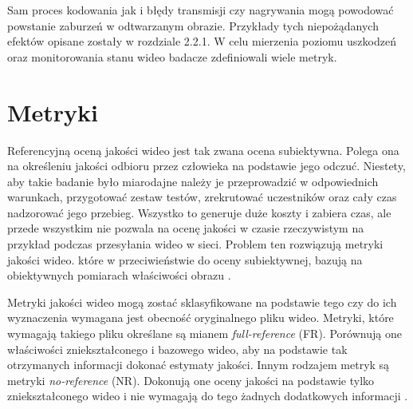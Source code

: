 Sam proces kodowania jak i błędy transmisji czy nagrywania mogą powodować powstanie zaburzeń w odtwarzanym obrazie. Przykłady tych niepożądanych efektów opisane zostały w rozdziale 2.2.1. W celu mierzenia poziomu uszkodzeń oraz monitorowania stanu wideo badacze zdefiniowali wiele metryk.\par 


\section{Metryki}

Referencyjną oceną jakości wideo jest tak zwana ocena subiektywna. Polega ona na określeniu jakości odbioru przez człowieka na podstawie jego odczuć. Niestety, aby takie badanie było miarodajne należy je przeprowadzić w odpowiednich warunkach, przygotować zestaw testów, zrekrutować uczestników oraz cały czas nadzorować jego przebieg. Wszystko to generuje duże koszty i zabiera czas, ale przede wszystkim nie pozwala na ocenę jakości w czasie rzeczywistym na przykład podczas przesyłania wideo w sieci. Problem ten rozwiązują metryki jakości wideo. które w przeciwieństwie do oceny subiektywnej, bazują na obiektywnych pomiarach właściwości obrazu \cite{vqm}.\par

Metryki jakości wideo mogą zostać sklasyfikowane na podstawie tego czy do ich wyznaczenia wymagana jest obecność oryginalnego pliku wideo. Metryki, które wymagają takiego pliku określane są mianem {\em  full-reference} (FR). Porównują one właściwości zniekształconego i bazowego wideo, aby na podstawie tak otrzymanych informacji dokonać estymaty jakości. Innym rodzajem metryk są metryki {\em no-reference} (NR). Dokonują one oceny jakości na podstawie tylko zniekształconego wideo i nie wymagają do tego żadnych dodatkowych informacji \cite{vqm}.\par



